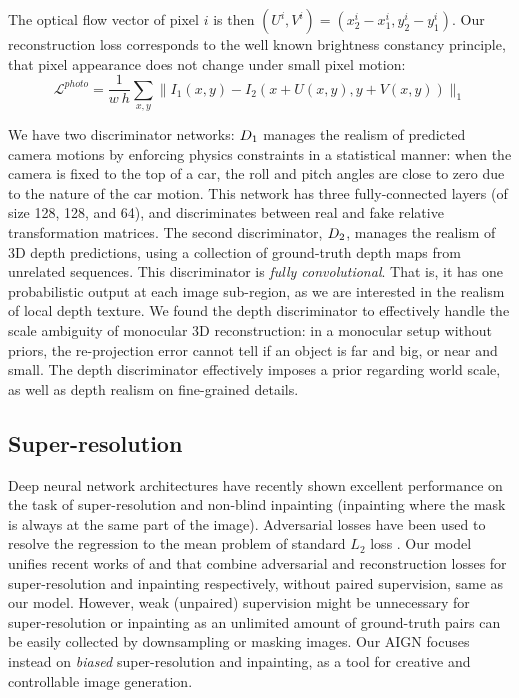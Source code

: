\documentclass[10pt,twocolumn,letterpaper]{article}
\begin{document}
\begin{bibunit}[ieee]
The optical flow vector of pixel $i$  is then $(U^i,V^i)=(x^i_{2} - x^i_1, y^i_{2} - y^i_1)$.  Our reconstruction loss corresponds to  the well known brightness constancy principle, that pixel appearance does not change under small pixel motion:
\begin{equation}
   \mathcal{L}^{photo} = \frac{1}{w~h}\sum_{x,y} \|I_1(x, y) - I_2(x + U(x, y), y + V(x, y)) \|_1
\end{equation}

We have two discriminator networks: $D_1$ manages the realism of predicted camera motions by enforcing physics constraints in a statistical  manner: when the camera is fixed to the top of a car, the roll and pitch angles are close to zero due to the nature of the car motion. This network has three fully-connected layers (of size 128, 128, and 64), and discriminates between real and fake relative transformation matrices. 
The second discriminator, $D_2$, 
manages the realism of 3D depth predictions, using a collection of ground-truth depth maps from unrelated sequences. This discriminator is \textit{fully convolutional}. That is, it has one probabilistic output at each image sub-region, as we are interested in the realism of local depth texture. %
We found the depth discriminator to effectively handle the scale ambiguity of monocular 3D reconstruction: in a monocular setup without priors, the re-projection error cannot tell if an object is far and big, or near and small. The depth discriminator effectively imposes a prior regarding world scale, as well as depth realism on fine-grained details.  

\subsection{Super-resolution}
Deep neural network architectures have recently shown excellent performance on the task of super-resolution \cite{DBLP:journals/corr/DongLHT15,DBLP:journals/corr/BrunaSL15} and non-blind inpainting \cite{pathakCVPR16context,DBLP:journals/corr/YehCLHD16} (inpainting where the mask is always at the same part of the image). Adversarial losses have been used to resolve the regression to the mean problem of standard $L_2$ loss \cite{DBLP:journals/corr/LedigTHCATTWS16,pathakCVPR16context}. 
Our model unifies recent works of \cite{sonderby2014apparent} and \cite{DBLP:journals/corr/YehCLHD16} that combine adversarial and reconstruction losses for super-resolution and inpainting respectively, without paired supervision, same as our model. 
However, weak (unpaired) supervision might be unnecessary for  super-resolution or inpainting  as an unlimited amount of ground-truth pairs can be easily collected by downsampling or masking images. Our AIGN focuses instead on \textit{biased} super-resolution and  inpainting, as a tool for creative and controllable image generation. 


\end{bibunit}
\end{document}
